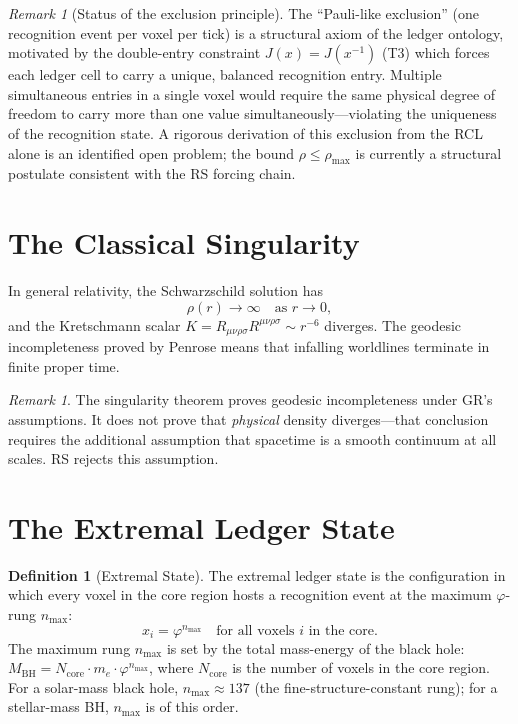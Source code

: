 \documentclass[12pt,a4paper]{article}
\theoremstyle{definition}
\newtheorem{definition}[theorem]{Definition}
\theoremstyle{remark}
\newtheorem{remark}[theorem]{Remark}
\begin{document}
\begin{remark}[Status of the exclusion principle]
The ``Pauli-like exclusion'' (one recognition event per voxel per tick)
is a structural axiom of the ledger ontology, motivated by the double-entry
constraint $J(x) = J(x^{-1})$ (T3) which forces each ledger cell to
carry a unique, balanced recognition entry.  Multiple simultaneous
entries in a single voxel would require the same physical degree of
freedom to carry more than one value simultaneously---violating the
uniqueness of the recognition state.  A rigorous derivation of this
exclusion from the RCL alone is an identified open problem; the bound
$\rho \le \rho_{\max}$ is currently a structural postulate consistent
with the RS forcing chain.
\end{remark}

\section{The Classical Singularity}
\label{sec:classical}

In general relativity, the Schwarzschild solution has
\begin{equation}
  \rho(r) \to \infty \quad\text{as } r \to 0,
\end{equation}
and the Kretschmann scalar $K = R_{\mu\nu\rho\sigma}
R^{\mu\nu\rho\sigma} \sim r^{-6}$ diverges.  The geodesic
incompleteness proved by Penrose means that infalling worldlines
terminate in finite proper time.

\begin{remark}
The singularity theorem proves geodesic incompleteness under GR's
assumptions.  It does not prove that \emph{physical} density
diverges---that conclusion requires the additional assumption that
spacetime is a smooth continuum at all scales.  RS rejects this
assumption.
\end{remark}

\section{The Extremal Ledger State}
\label{sec:extremal}

\begin{definition}[Extremal State]
The extremal ledger state is the configuration in which every voxel
in the core region hosts a recognition event at the maximum
$\varphi$-rung $n_{\max}$:
\begin{equation}
  x_i = \varphi^{n_{\max}} \quad\text{for all voxels } i
  \text{ in the core}.
\end{equation}
The maximum rung $n_{\max}$ is set by the total mass-energy of the
black hole: $M_{\mathrm{BH}} = N_{\mathrm{core}} \cdot m_e \cdot
\varphi^{n_{\max}}$, where $N_{\mathrm{core}}$ is the number of
voxels in the core region.  For a solar-mass black hole,
$n_{\max} \approx 137$ (the fine-structure-constant rung); for a
stellar-mass BH, $n_{\max}$ is of this order.
\end{definition}
\end{document}
